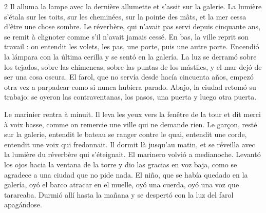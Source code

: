 \begin{paracol}{2}
\pair
  {Il alluma la lampe avec la dernière allumette et s'assit sur la galerie. La
   lumière s'étala sur les toits, sur les cheminées, sur la pointe des mâts,
   et la mer cessa d'être une chose sombre. Le réverbère, qui n'avait pas
   servi depuis cinquante ans, se remit à clignoter comme s'il n'avait jamais
   cessé. En bas, la ville reprit son travail : on entendit les volets, les
   pas, une porte, puis une autre porte.}
  {Encendió la lámpara con la última cerilla y se sentó en la galería. La luz
   se derramó sobre los tejados, sobre las chimeneas, sobre las puntas de los
   mástiles, y el mar dejó de ser una cosa oscura. El farol, que no servía
   desde hacía cincuenta años, empezó otra vez a parpadear como si nunca
   hubiera parado. Abajo, la ciudad retomó su trabajo: se oyeron las
   contraventanas, los pasos, una puerta y luego otra puerta.}

\pair
  {Le marinier rentra à minuit. Il leva les yeux vers la fenêtre de la tour et
   dit merci à voix basse, comme on remercie une ville qui ne demande rien.
   Le garçon, resté sur la galerie, entendit le bateau se ranger contre le
   quai, entendit une corde, entendit une voix qui fredonnait. Il dormit là
   jusqu'au matin, et se réveilla avec la lumière du réverbère qui
   s'éteignait.}
  {El marinero volvió a medianoche. Levantó los ojos hacia la ventana de la
   torre y dio las gracias en voz baja, como se agradece a una ciudad que no
   pide nada. El niño, que se había quedado en la galería, oyó el barco
   atracar en el muelle, oyó una cuerda, oyó una voz que tarareaba. Durmió
   allí hasta la mañana y se despertó con la luz del farol apagándose.}

\end{paracol}


